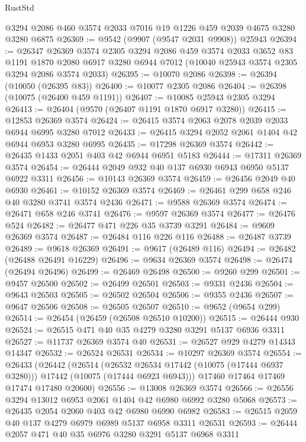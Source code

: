 \begin{lexlean}{RustStd}
\begin{coremodule}
    @3294
    @2086
    @460
    @3574
    @2033
    @7016
    @19
    @1226
    @459
    @2039
    @4675
    @3280
    @3280
    @6875
@26369 := @9542 (@9907 (@9547 @2031 @9908)) @25943
@26394 := @26347
    @26369
    @3574
    @2305
    @3294
    @2086
    @459
    @3574
    @2033
    @3652
    @83
    @1191
    @1870
    @2080
    @6917
    @3280
    @6944
    @7012
    (@10040 @25943 @3574 @2305 @3294 @2086 @3574 @2033)
@26395 := @10070 @2086
@26398 := @26394 (@10050 (@26395 @83))
@26400 := @10077 @2305 @2086
@26404 := @26398 (@10075 (@26400 @459 @1191))
@26407 := @10085 @25943 @2305 @3294
@26413 := @26404 (@9570 (@26407 @1191 @1870 @6917 @3280))
@26415 := @12853 @26369 @3574
@26424 := @26415 @3574 @2063 @2078 @2039 @2033 @6944 @6995 @3280 @7012
@26433 := @26415 @3294 @2052 @2061 @1404 @42 @6944 @6953 @3280 @6995
@26435 := @17298 @26369 @3574
@26442 := @26435 @1433 @2051 @403 @42 @6944 @6951 @5183
@26444 := @17311 @26369 @3574
@26454 := @26444 @2049 @932 @40 @137 @6930 @6943 @6950 @5137 @6922 @3311
@26456 := @10143 @26369 @3574
@26459 := @26456 @2049 @40 @6930
@26461 := @10152 @26369 @3574
@26469 := @26461 @299 @658 @246 @40 @3280 @3741 @3574 @2436
@26471 := @9588 @26369 @3574
@26474 := @26471 @658 @246 @3741
@26476 := @9597 @26369 @3574
@26477 := @26476 @524
@26482 := @26477 @471 @226 @35 @3739 @3291
@26484 := @9609 @26369 @3574
@26487 := @26484 @116 @226 @116
@26488 := @26487 @3739
@26489 := @9618 @26369
@26491 := @9617 (@26489 @116)
@26494 := @26482 (@26488 @26491 @16229)
@26496 := @9634 @26369 @3574
@26498 := @26474 (@26494 @26496)
@26499 := @26469 @26498
@26500 := @9260 @299
@26501 := @9457 @26500
@26502 := @26499 @26501
@26503 := @9331 @2436
@26504 := @9643 @26503
@26505 := @26502 @26504
@26506 := @9355 @2436
@26507 := @9647 @26506
@26508 := @26505 @26507
@26510 := @9652 (@9654 @299)
@26514 := @26454 (@26459 (@26508 @26510 @10200))
@26515 := @26444 @930
@26524 := @26515 @471 @40 @35 @4279 @3280 @3291 @5137 @6936 @3311
@26527 := @11737 @26369 @3574 @40
@26531 := @26527 @929 @4279 @14343 @14347
@26532 := @26524 @26531
@26534 := @10297 @26369 @3574
@26554 := @26433
    (@26442
      (@26514
        (@26532 @26534 @17442 (@10075 (@17444 @6937 @3280)))
        @17442
        (@10075 (@17444 @6923 @6943)))
      @17460
      @17464
      @17469
      @17474
      @17480
      @20600)
@26556 := @13008 @26369 @3574
@26566 := @26556 @3294 @13012 @6953 @2061 @1404 @42 @6980 @6992 @3280 @5068
@26573 := @26435 @2054 @2060 @403 @42 @6980 @6990 @6982
@26583 := @26515 @2059 @40 @137 @4279 @6979 @6989 @5137 @6958 @3311 @26531
@26593 := @26444 @2057 @471 @40 @35 @6976 @3280 @3291 @5137 @6968 @3311

\end{coremodule}
\end{lexlean}
